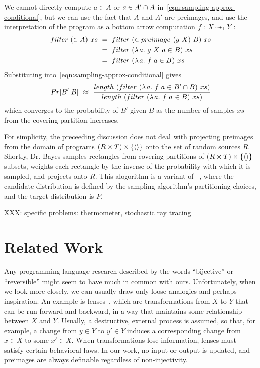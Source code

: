 \documentclass{llncs}
\newcommand{\arrow}{\rightsquigarrow}
\DeclareMathOperator{\botto}{\arrow_{\mspace{-3mu}\bot}}
\begin{document}
We cannot directly compute $a \in A$ or $a \in A' \cap A$ in~\eqref{eqn:sampling-approx-conditional}, but we can use the fact that $A$ and $A'$ are preimages, and use the interpretation of the program as a bottom arrow computation $f : X \botto Y$:
\begin{equation}
\begin{aligned}
	filter~(\in A)~xs
		&\ = \ filter~(\in preimage~(g~X)~B)~xs
\\
		&\ = \ filter~(\lambda\mspace{2mu}{a}\ldotp\,{g~X~a \in B})~xs
\\
		&\ = \ filter~(\lambda\mspace{2mu}{a}\ldotp\,{f~a \in B})~xs
\end{aligned}
\end{equation}
Substituting into~\eqref{eqn:sampling-approx-conditional} gives
\begin{equation}
	Pr[B'|B] \ \approx \ \frac{length~(filter~(\fun{a}{f~a \in B' \i B})~xs)}{length~(filter~(\fun{a}{f~a \in B})~xs)}
\end{equation}
which converges to the probability of $B'$ given $B$ as the number of samples $xs$ from the covering partition increases.

For simplicity, the preceeding discussion does not deal with projecting preimages from the domain of programs $(R \times T) \times \{{\langle{}\rangle}\}$ onto the set of random sources $R$.
Shortly, Dr. Bayes samples rectangles from covering partitions of $(R \times T) \times \{{\langle{}\rangle}\}$ subsets, weights each rectangle by the inverse of the probability with which it is sampled, and projects onto $R$.
This alogorithm is a variant of ~\cite[Section 12.4]{cit:degroot-2012book-probability}, where the candidate distribution is defined by the sampling algorithm's partitioning choices, and the target distribution is $P$.

XXX: specific problems: thermometer, stochastic ray tracing


\section{Related Work}

Any programming language research described by the words ``bijective'' or ``reversible'' might seem to have much in common with ours.
Unfortunately, when we look more closely, we can usually draw only loose analogies and perhaps inspiration.
An example is lenses~\cite{cit:hofmann-2012popl-edit-lenses}, which are transformations from $X$ to $Y$ that can be run forward and backward, in a way that maintains some relationship between $X$ and $Y$.
Usually, a destructive, external process is assumed, so that, for example, a change from $y \in Y$ to $y' \in Y$ induces a corresponding change from $x \in X$ to some $x' \in X$.
When transformations lose information, lenses must satisfy certain behavioral laws.
In our work, no input or output is updated, and preimages are always definable regardless of non-injectivity.
\end{document}
